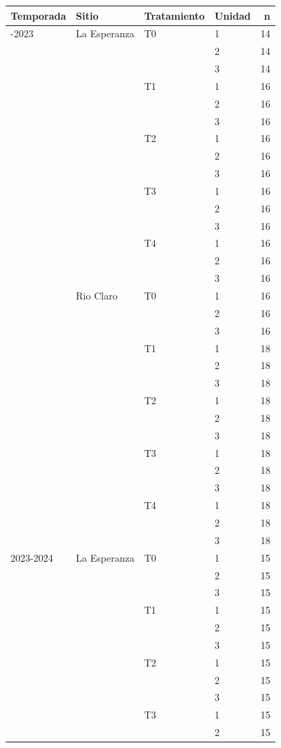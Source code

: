 \documentclass[
  letterpaper,
  DIV=11,
  numbers=noendperiod]{scrreprt}
\begin{document}
\begin{longtable}[]{@{}llllr@{}}
\toprule\noalign{}
Temporada & Sitio & Tratamiento & Unidad & n \\
\midrule\noalign{}
\endhead
\bottomrule\noalign{}
\endlastfoot
2022-2023 & La Esperanza & T0 & 1 & 14 \\
& & & 2 & 14 \\
& & & 3 & 14 \\
& & T1 & 1 & 16 \\
& & & 2 & 16 \\
& & & 3 & 16 \\
& & T2 & 1 & 16 \\
& & & 2 & 16 \\
& & & 3 & 16 \\
& & T3 & 1 & 16 \\
& & & 2 & 16 \\
& & & 3 & 16 \\
& & T4 & 1 & 16 \\
& & & 2 & 16 \\
& & & 3 & 16 \\
& Rio Claro & T0 & 1 & 16 \\
& & & 2 & 16 \\
& & & 3 & 16 \\
& & T1 & 1 & 18 \\
& & & 2 & 18 \\
& & & 3 & 18 \\
& & T2 & 1 & 18 \\
& & & 2 & 18 \\
& & & 3 & 18 \\
& & T3 & 1 & 18 \\
& & & 2 & 18 \\
& & & 3 & 18 \\
& & T4 & 1 & 18 \\
& & & 2 & 18 \\
& & & 3 & 18 \\
2023-2024 & La Esperanza & T0 & 1 & 15 \\
& & & 2 & 15 \\
& & & 3 & 15 \\
& & T1 & 1 & 15 \\
& & & 2 & 15 \\
& & & 3 & 15 \\
& & T2 & 1 & 15 \\
& & & 2 & 15 \\
& & & 3 & 15 \\
& & T3 & 1 & 15 \\
& & & 2 & 15 \\

\end{longtable}
\end{document}
